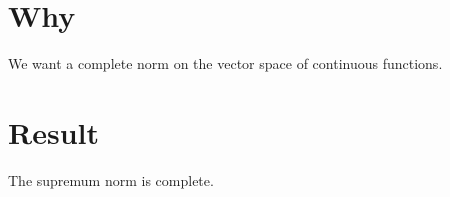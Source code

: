 

\section*{Why}

We want a complete norm on the vector space of continuous functions.

\section*{Result}

\begin{proposition}
The supremum norm is complete.
\end{proposition}

